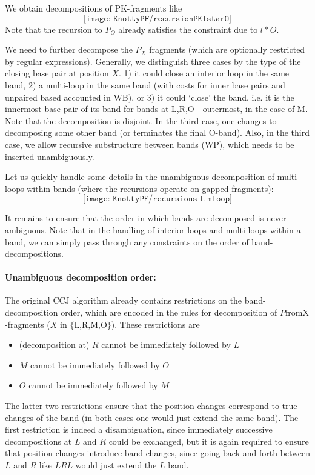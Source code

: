\documentclass[11pt]{article} %
\begin{document}
We obtain decompositions of PK-fragments like 
\begin{equation}
\texttt{[image: KnottyPF/recursionPKlstarO]}
\end{equation}
Note that the recursion to $P_O$ already satisfies the constraint due to $l*O$.

We need to further decompose the $P_X$ fragments (which are optionally restricted by regular expressions). Generally, we distinguish three cases by the type of the closing base pair at position $X$. 1) it could close an interior loop in the same band, 2) a multi-loop in the same band (with costs for inner base pairs and unpaired based accounted in WB), or 3) it could `close' the band, i.e. it is the innermost base pair of its band for bands at L,R,O---outermost, in the case of M. Note that the decomposition is disjoint. In the
third case, one changes to decomposing some other band (or terminates the final O-band). Also, in the third case, we allow recursive substructure between bands (WP), which needs to be inserted unambiguously.

Let us quickly handle some details in the unambiguous decomposition of multi-loops within bands (where the recursions operate on gapped fragments):
\begin{equation}
\texttt{[image: KnottyPF/recursions-L-mloop]}
\end{equation}


It remains to ensure that the order in which bands are decomposed is never ambiguous. Note that in the handling of interior loops and multi-loops within a band, we can simply pass through any constraints on the order of band-decompositions.

\paragraph{Unambiguous decomposition order:}
The original CCJ algorithm already contains restrictions on the band-decomposition order, which are encoded in the rules for decomposition of $P\text{fromX}$-fragments ($X$ in $\{\text{L,R,M,O}\}$). These restrictions are
\begin{itemize}
\item (decomposition at) $R$ cannot be immediately followed by $L$
\item $M$ cannot be immediately followed by $O$
\item $O$ cannot be immediately followed by $M$
\end{itemize} 
The latter two restrictions ensure that the position changes correspond to true changes of the band (in both cases one would just extend the same band). The first restriction is indeed a disambiguation, since immediately successive decompositions at $L$ and $R$ could be exchanged, but it is again required to ensure that position changes introduce band changes, since going back and forth between $L$ and $R$ like $LRL$ would just extend the $L$ band. 
\end{document}

